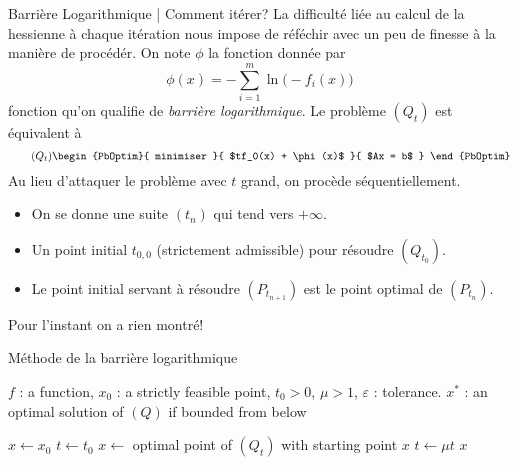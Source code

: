 \documentclass[aspectratio = 169]{beamer}
\begin{document}
\begin{frame}{Barrière Logarithmique | Comment itérer?}
  La difficulté liée au calcul de la hessienne à chaque itération nous
  impose de réféchir avec un peu de finesse à la manière de
  procédér. On note $\phi$ la fonction donnée par
  \[
    \phi(x) = - \sum_{i=1}^m \ln\big(-f_i(x)\big)
  \]
  fonction qu'on qualifie de \emph{barrière logarithmique}. \pause Le
  problème $(Q_t)$ est équivalent à
  \begin{equation}
    \label{Qtrf}
    \tag{$Q_t$}
    \begin{PbOptim}{
        minimiser
      }{
        $tf_0(x) + \phi(x)$
      }{
        $Ax = b$
      }
    \end{PbOptim}
  \end{equation}
  \pause Au lieu d'attaquer le problème avec $t$ grand, on procède
  séquentiellement.
  \begin{itemize}
  \item<1-> On se donne une suite $(t_n)$ qui tend vers $+\infty$.
  \item<2-> Un point initial $t_{0, 0}$ (strictement admissible) pour
    résoudre $(Q_{t_0})$.
  \item<3-> Le point initial servant à résoudre $(P_{t_{n+1}})$ est le
    point optimal de $(P_{t_{n}})$.
  \end{itemize}
\end{frame}

\begin{frame}
  \centering
  \begin{center}
    {\Huge Pour l'instant on a rien montré!}
  \end{center}
\end{frame}

\begin{frame}{Méthode de la barrière logarithmique}
    \begin{algorithm}[H]
    \caption{Méthode de la barrière logarithmique}
    \small{
      \begin{algorithmic}[1]
        \Statex
        \Require $f$ : a function, $x_0$ : a strictly feasible point,
        $t_0 > 0$, $\mu > 1$, $\varepsilon$ : tolerance.
        \Ensure $x^*$ : an optimal solution of $(Q)$ if bounded from below

        \State $x \leftarrow x_0$
        \State $t \leftarrow t_0$
        \State $x \leftarrow$ optimal point of $(Q_t)$ with starting point $x$
        \State $t \leftarrow \mu t$
        \EndWhile
        \State \Return $x$
        \EndFunction
        \Statex
      \end{algorithmic}
    }
  \end{algorithm}
\end{frame}
\end{document}
